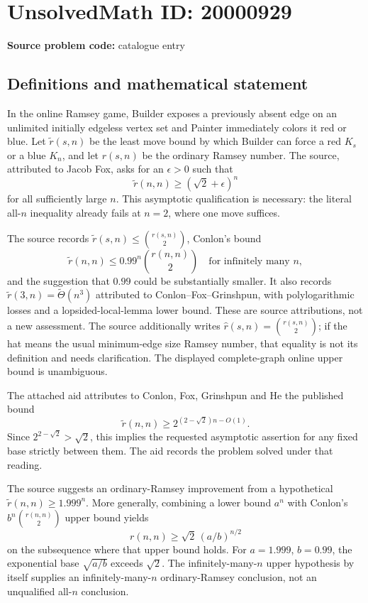 \documentclass[11pt]{article}
\begin{document}
\section*{UnsolvedMath ID: 20000929}
\textbf{Source problem code:} catalogue entry
\subsection{Definitions and mathematical statement}
In the online Ramsey game, Builder exposes a previously absent edge on an unlimited initially edgeless vertex set and Painter immediately colors it red or blue. Let $\widetilde r(s,n)$ be the least move bound by which Builder can force a red $K_s$ or a blue $K_n$, and let $r(s,n)$ be the ordinary Ramsey number. The source, attributed to Jacob Fox, asks for an $\epsilon>0$ such that
\[
\widetilde r(n,n)\ge(\sqrt2+\epsilon)^n
\]
for all sufficiently large $n$. This asymptotic qualification is necessary: the literal all-$n$ inequality already fails at $n=2$, where one move suffices.

The source records $\widetilde r(s,n)\le\binom{r(s,n)}2$, Conlon's bound
\[
\widetilde r(n,n)\le0.99^n\binom{r(n,n)}2
\quad\text{for infinitely many }n,
\]
and the suggestion that $0.99$ could be substantially smaller. It also records $\widetilde r(3,n)=\widetilde\Theta(n^3)$ attributed to Conlon--Fox--Grinshpun, with polylogarithmic losses and a lopsided-local-lemma lower bound. These are source attributions, not a new assessment. The source additionally writes $\widehat r(s,n)=\binom{r(s,n)}2$; if the hat means the usual minimum-edge size Ramsey number, that equality is not its definition and needs clarification. The displayed complete-graph online upper bound is unambiguous.

The attached aid attributes to Conlon, Fox, Grinshpun and He the published bound
\[
\widetilde r(n,n)\ge2^{(2-\sqrt2)n-O(1)}.
\]
Since $2^{2-\sqrt2}>\sqrt2$, this implies the requested asymptotic assertion for any fixed base strictly between them. The aid records the problem solved under that reading.

The source suggests an ordinary-Ramsey improvement from a hypothetical $\widetilde r(n,n)\ge1.999^n$. More generally, combining a lower bound $a^n$ with Conlon's $b^n\binom{r(n,n)}2$ upper bound yields
\[
r(n,n)\ge\sqrt2\,(a/b)^{n/2}
\]
on the subsequence where that upper bound holds. For $a=1.999$, $b=0.99$, the exponential base $\sqrt{a/b}$ exceeds $\sqrt2$. The infinitely-many-$n$ upper hypothesis by itself supplies an infinitely-many-$n$ ordinary-Ramsey conclusion, not an unqualified all-$n$ conclusion.
\end{document}
